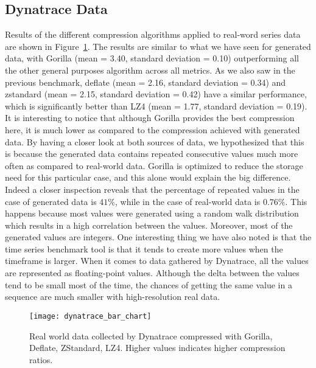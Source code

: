 \subsection{Dynatrace Data}
Results of the different compression algorithms applied to real-word series data are shown in
Figure~\ref{dynatrace_compression}. The results are similar to what we have seen for generated data,
with Gorilla (mean = 3.40, standard deviation = 0.10) outperforming all the other general purposes algorithm across all metrics.
As we also saw in the previous benchmark, deflate (mean = 2.16, standard deviation = 0.34) and zstandard (mean = 2.15, standard deviation = 0.42)
have a similar performance, which is significantly better than LZ4 (mean = 1.77, standard deviation = 0.19).
It is interesting to notice that although Gorilla provides the best compression here, it is much lower as compared to the compression achieved with generated data.
By having a closer look at both sources of data, we hypothesized that this is because the generated data contains repeated consecutive values
much more often as compared to real-world data. Gorilla is optimized to reduce the storage need for this particular case, and this
alone would explain the big difference.
Indeed a closer inspection reveals that the percentage of repeated values in the case of generated data is $41\%$, while in the case
of real-world data is $0.76\%$.
This happens because most values were generated using a random walk distribution which results in a high correlation between the values. Moreover, most of the generated
values are integers. One interesting thing we have also noted is that the time series benchmark tool is that it tends to create more values when the timeframe is larger.
When it comes to data gathered by Dynatrace, all the values are represented as floating-point values. Although the delta between the values tend to be small most of
the time, the chances of getting the same value in a sequence are much smaller with high-resolution real data.  

\begin{figure}[!htbp]
\begin{center}
\texttt{[image: dynatrace\_bar\_chart]}
\caption[compression]{Real world data collected by Dynatrace compressed with Gorilla, Deflate, ZStandard, LZ4.
Higher values indicates higher compression ratios.}
\label{dynatrace_compression}
\end{center}
\end{figure}


